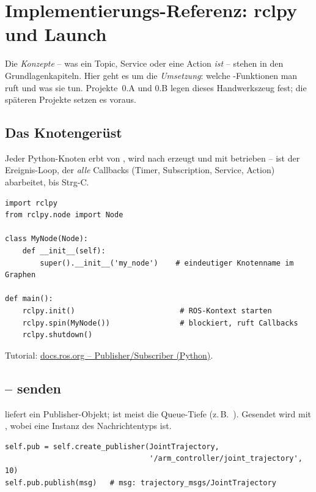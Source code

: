 \section{Implementierungs-Referenz: rclpy und Launch}
Die \emph{Konzepte} -- was ein Topic, Service oder eine Action \emph{ist} --
stehen in den Grundlagenkapiteln. Hier geht es um die \emph{Umsetzung}: welche
-Funktionen man ruft und was sie tun. Projekte~0.A und 0.B legen
dieses Handwerkszeug fest; die späteren Projekte setzen es voraus.

\subsection{Das Knotengerüst}
Jeder Python-Knoten erbt von , wird nach 
erzeugt und mit  betrieben --  ist der
Ereignis-Loop, der \emph{alle} Callbacks (Timer, Subscription, Service, Action)
abarbeitet, bis Strg-C.
\begin{lstlisting}[style=py,caption={Minimales Knotengerüst}]
import rclpy
from rclpy.node import Node

class MyNode(Node):
    def __init__(self):
        super().__init__('my_node')    # eindeutiger Knotenname im Graphen

def main():
    rclpy.init()                        # ROS-Kontext starten
    rclpy.spin(MyNode())                # blockiert, ruft Callbacks
    rclpy.shutdown()
\end{lstlisting}
\noindent Tutorial: \href{https://docs.ros.org/en/jazzy/Tutorials/Beginner-Client-Libraries/Writing-A-Simple-Py-Publisher-And-Subscriber.html}{docs.ros.org -- Publisher/Subscriber (Python)}.

\subsection{ -- senden}
 liefert ein Publisher-Objekt;
 ist meist die Queue-Tiefe (z.\,B.\ ). Gesendet wird mit
, wobei  eine Instanz des Nachrichtentyps ist.
\begin{lstlisting}[style=py]
self.pub = self.create_publisher(JointTrajectory,
                                 '/arm_controller/joint_trajectory', 10)
self.pub.publish(msg)   # msg: trajectory_msgs/JointTrajectory
\end{lstlisting}

